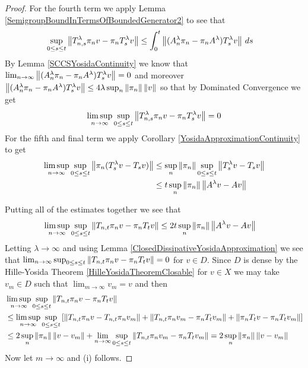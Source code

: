 \begin{proof}
For the fourth term we apply Lemma \ref{SemigroupBoundInTermsOfBoundedGenerator2} to see that 
\begin{align*}
\sup_{0 \leq s \leq t} \left \lVert T^\lambda_{n,s} \pi_n v - \pi_n T^\lambda_{s} v  \right \rVert 
&\leq \int_0^t \left \lVert (A^\lambda_n \pi_n - \pi_n A^\lambda) T^\lambda_s v \right \rVert \, ds
\end{align*}
By Lemma \ref{SCCSYosidaContinuity} we know that $\lim_{n \to \infty} \left \lVert (A^\lambda_n \pi_n - \pi_n A^\lambda) T^\lambda_s v \right \rVert = 0$ and moreover $\left \lVert (A^\lambda_n \pi_n - \pi_n A^\lambda) T^\lambda_s v \right \rVert \leq 4 \lambda \sup_n \left \lVert \pi_n \right \rVert \left \lVert v \right \rVert$ so that by Dominated Convergence we get  
\begin{align*}
\limsup_{n \to \infty} \sup_{0 \leq s \leq t} \left \lVert T^\lambda_{n,s} \pi_n v - \pi_n T^\lambda_{s} v  \right \rVert = 0
\end{align*}
For the fifth and final term we apply Corollary \ref{YosidaApproximationContinuity} to get
\begin{align*}
\limsup_{n \to \infty} \sup_{0 \leq s \leq t} \left \lVert \pi_n ( T^\lambda_{s} v - T_s v) \right \rVert &\leq \sup_{n} \left \lVert \pi_n \right \rVert \sup_{0 \leq s \leq t} \left \lVert T^\lambda_{s} v - T_s v \right \rVert \\
&\leq t \sup_{n} \left \lVert \pi_n \right \rVert \left \lVert A^\lambda v - A v \right \rVert
\end{align*}

Putting all of the estimates together we see that
\begin{align*}
\limsup_{n \to \infty} \sup_{0 \leq s \leq t} \left \lVert T_{n,t} \pi_n v - \pi_n T_t v \right \rVert  &\leq 2 t \sup_{n} \left \lVert \pi_n \right \rVert \left \lVert A^\lambda v - A v \right \rVert
\end{align*}
Letting $\lambda \to \infty$ and using Lemma \ref{ClosedDissipativeYosidaApproximation} we see that $\lim_{n \to \infty} \sup_{0 \leq s \leq t} \left \lVert T_{n,t} \pi_n v - \pi_n T_t v \right \rVert =0$ for 
$v \in D$.  Since $D$ is dense by the Hille-Yosida Theorem \ref{HilleYosidaTheoremClosable} for $v \in X$ we may take $v_m \in D$ such that $\lim_{m \to \infty} v_m = v$ and then
\begin{align*}
&\limsup_{n \to \infty} \sup_{0 \leq s \leq t} \left \lVert T_{n,t} \pi_n v - \pi_n T_t v \right \rVert \\
&\leq \limsup_{n \to \infty} \sup_{0 \leq s \leq t} \left[\left \lVert T_{n,t} \pi_n v- T_{n,t} \pi_n v_m \right \rVert + \left \lVert T_{n,t} \pi_n v_m - \pi_n T_t v_m \right \rVert + \left \lVert \pi_n T_t v - \pi_n T_t v_m \right \rVert  \right] \\
&\leq 2 \sup_n \left \lVert \pi_n \right \rVert \left \lVert v - v_m \right \rVert + \lim_{n \to \infty} \sup_{0 \leq s \leq t} \left \lVert T_{n,t} \pi_n v_m - \pi_n T_t v_m \right \rVert = 2 \sup_n \left \lVert \pi_n \right \rVert \left \lVert v - v_m \right \rVert 
\end{align*}
Now let $m \to \infty$ and (i) follows.
\end{proof}

